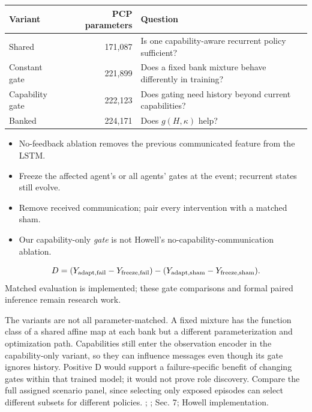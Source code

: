 {\small
\begin{tabular}{lrl}\toprule
Variant & PCP parameters & Question\\\midrule
Shared & 171,087 & Is one capability-aware recurrent policy sufficient?\\
Constant gate & 221,899 & Does a fixed bank mixture behave differently in training?\\
Capability gate & 222,123 & Does gating need history beyond current capabilities?\\
Banked & 224,171 & Does $g(H,\kappa)$ help?\\
\bottomrule\end{tabular}
\begin{itemize}
\item No-feedback ablation removes the previous communicated feature from the LSTM.
\item Freeze the affected agent's or all agents' gates at the event; recurrent states still evolve.
\item Remove received communication; pair every intervention with a matched sham.
\item Our capability-only \emph{gate} is not Howell's no-capability-communication ablation.
\end{itemize}
\[
D=(Y_{\rm adapt,fail}-Y_{\rm freeze,fail})-(Y_{\rm adapt,sham}-Y_{\rm freeze,sham}).
\]
\small Matched evaluation is implemented; these gate comparisons and formal paired inference remain research work.}
{The variants are not all parameter-matched. A fixed mixture has the function class of a shared affine map at each bank but a different parameterization and optimization path. Capabilities still enter the observation encoder in the capability-only variant, so they can influence messages even though its gate ignores history. Positive D would support a failure-specific benefit of changing gates within that trained model; it would not prove role discovery. Compare the full assigned scenario panel, since selecting only exposed episodes can select different subsets for different policies.}
{; ;  Sec. 7; Howell implementation.}

